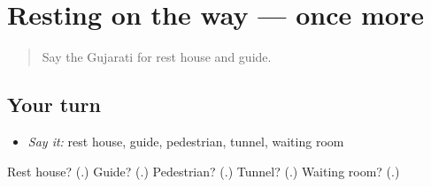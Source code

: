 \section[(dialogue)]{Resting on the way — once more}

\label{lesson:GU-R212-review-final-212}



\begin{quote}
Say the Gujarati for rest house and guide.
\end{quote}

\subsection*{Your turn}
\begin{itemize}
\raggedright
  \item \emph{Say it:} rest house, guide, pedestrian, tunnel, waiting room
\end{itemize}

\begin{tcolorbox}[breakable,colback=teal!4,colframe=teal!35!black,title={Before you move on}]
Rest house? (\textbf{}.) Guide? (\textbf{}.) Pedestrian? (\textbf{}.) Tunnel? (\textbf{}.) Waiting room? (\textbf{}.)
\end{tcolorbox}
